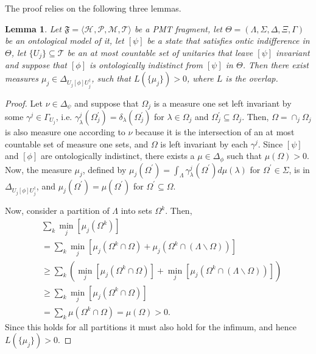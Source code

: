 \documentclass[DIV=calc,paper=a4,fontsize=11pt,twocolumn]{scrartcl} %
\theoremstyle{definition}
\theoremstyle{plain}
\newtheorem{lemma}[definition]{Lemma}
\newcommand{\Proj}[1]{\ensuremath{\left [ #1 \right ]}}
\newcommand{\Hilb}[1][]{\ensuremath{\mathcal{H}_{#1}}}
\begin{document}
The proof relies on the following three lemmas.
\begin{lemma}
\label{lem:Hardy:overlap}
Let $\mathfrak{F} = \langle \Hilb, \mathcal{P}, \mathcal{M},
\mathcal{T} \rangle$ be a PMT fragment, let $\Theta = (\Lambda, \Sigma,
\Delta, \Xi, \Gamma)$ be an ontological model of it, let
$\Proj{\psi}$ be a state that satisfies ontic indifference in $\Theta$,
let $\{U_j\} \subseteq \mathcal{T}$ be an at most countable set of
unitaries that leave $\Proj{\psi}$ invariant and suppose that
$\Proj{\phi}$ is ontologically indistinct from $\Proj{\psi}$ in
$\Theta$.  Then there exist measures $\mu_j \in \Delta_{U_j
\Proj{\phi}U_j^{\dagger}}$, such that $L(\{\mu_j\}) > 0$, where
$L$ is the overlap.
\end{lemma}
\begin{proof}
Let $\nu \in \Delta_{\psi}$ and suppose that $\Omega_j$ is a measure
one set left invariant by some $\gamma^j \in \Gamma_{U_j}$,
i.e. $\gamma^j_{\lambda}(\Omega_j^{\prime}) =
\delta_{\lambda}(\Omega_j^{\prime})$ for $\lambda \in \Omega_j$ and
$\Omega_j^{\prime} \subseteq \Omega_j$.  Then, $\Omega = \cap_j
\Omega_j$ is also measure one according to $\nu$ because it is the
intersection of an at most countable set of measure one sets, and
$\Omega$ is left invariant by each $\gamma^j$.  Since $\Proj{\psi}$
and $\Proj{\phi}$ are ontologically indistinct, there exists a $\mu
\in \Delta_{\phi}$ such that $\mu(\Omega) > 0$.  Now, the measure
$\mu_j$, defined by $\mu_j(\Omega^{\prime}) = \int_{\Lambda}
\gamma^j_{\lambda}(\Omega^{\prime}) d\mu(\lambda)$ for
$\Omega^{\prime} \in \Sigma$, is in $\Delta_{U_j
\Proj{\phi}U_j^{\dagger}}$, and $\mu_j(\Omega^{\prime}) =
\mu(\Omega^{\prime})$ for $\Omega^{\prime} \subseteq \Omega$.

Now, consider a partition of $\Lambda$ into sets $\Omega^k$.  Then,
\begin{align}
&\sum_k \min_j \left [ \mu_j(\Omega^k )\right ] \nonumber\\
& = \sum_k \min_j
\left [ \mu_j \left ( \Omega^k \cap \Omega \right ) + \mu_j \left
( \Omega^k \cap \left ( \Lambda \backslash \Omega \right )
\right ) \right ] \\
& \geq \sum_k \left ( \min_j \left [ \mu_j \left ( \Omega^k \cap
\Omega \right ) \right ] + \min_j \left [ \mu_j \left (
\Omega^k \cap \left ( \Lambda
\backslash \Omega \right ) \right ) \right ] \right ) \\
& \geq \sum_k \min_j \left [ \mu_j \left ( \Omega^k \cap \Omega
\right ) \right ] \\
& = \sum_k \mu(\Omega^k \cap \Omega) = \mu(\Omega) > 0.
\end{align}
Since this holds for all partitions it must also hold for the
infimum, and hence $L(\{\mu_j\}) > 0$.
\end{proof}
\end{document}
